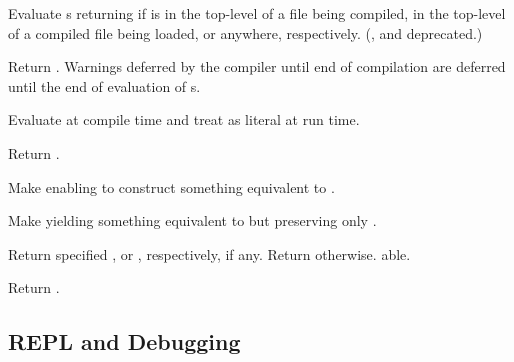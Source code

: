 \begin{LIST}{1cm}
  {
  Evaluate s returning  if
   is in the top-level of a file being compiled, in the
  top-level of a compiled file being loaded, or anywhere,
  respectively. (,  and  deprecated.)
  }

  {
  Return . Warnings deferred by the
  compiler until end of compilation are deferred until the end of
  evaluation of s. 
  }

  {
  Evaluate  at compile time and treat  as
  literal at run time. 
  }

  {
  Return .
  }

  {
  Make  enabling  to construct
  something equivalent to .
  }

  {
  Make  yielding something equivalent to 
  but preserving only .
  }

  {
  Return specified , or , respectively, if any. Return \retval{\NIL}
  otherwise. able. 
  }
  
  {
  Return .
  }

\end{LIST}


\subsection[REPL~\&~Debug]{REPL and Debugging} 

